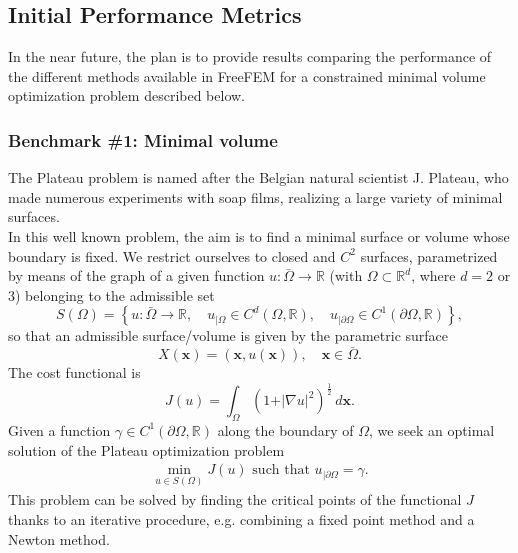 \subsection{Initial Performance Metrics}
\label{sec:WP5:Freefem++:metrics}

In the near future, the plan is to provide results comparing the performance of the different methods available in FreeFEM for a constrained minimal volume optimization problem described below.

\subsubsection{Benchmark \#1: Minimal volume}

The Plateau problem is named after the Belgian natural scientist J. Plateau, who made numerous experiments with soap films, realizing a large variety of minimal surfaces.\\
In this well known problem, the aim is to find a minimal surface or volume whose boundary is fixed. We restrict ourselves to closed and $C^2$ surfaces, parametrized by means of the graph of a given function $u:\bar{\Omega} \rightarrow \mathbb{R}$ (with $\Omega\subset\mathbb{R}^d$, where $d=2$ or $3$) belonging to the admissible set
\[
	S(\Omega) = \left\{ u:\bar{\Omega} \rightarrow \mathbb{R},\quad u_{\vert\Omega} \in C^d(\Omega,\mathbb{R}),\quad u_{\vert\partial\Omega} \in C^1(\partial\Omega,\mathbb{R}) \right\},
\]
so that an admissible surface/volume is given by the parametric surface 
$$
X(\boldsymbol{x}) = (\boldsymbol{x},u(\boldsymbol{x})), \quad \boldsymbol{x} \in \bar{\Omega} .
$$
The cost functional is
\[
	J(u) = \int_{\Omega} (1+\vert\nabla u\vert^2)^\frac{1}{2}\,d\boldsymbol{x} .
\]
Given a function $\gamma\in C^1(\partial\Omega,\mathbb{R})$ along the boundary of $\Omega$, we seek an optimal solution of the Plateau optimization problem 
\begin{align}
    \nonumber
	\min_{u \in S(\Omega)} J(u) \mbox{ such that } u_{\vert\partial\Omega} = \gamma .
\end{align}
This problem can be solved by finding the critical points of the functional $J$ thanks to an iterative procedure, e.g. combining a fixed point method and a Newton method.\\


